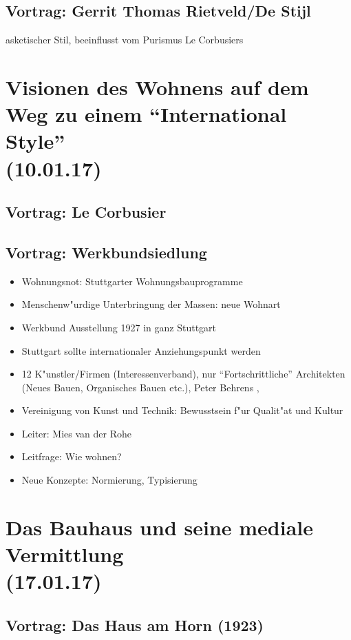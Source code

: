 \documentclass[emulatestandardclasses]{scrartcl}
\begin{document}
\subsection{Vortrag: Gerrit Thomas Rietveld/De Stijl}

asketischer Stil, beeinflusst vom Purismus Le Corbusiers

\section{Visionen des Wohnens auf dem Weg zu einem “International Style”\\(10.01.17)}

\subsection{Vortrag: Le Corbusier}

\subsection{Vortrag: Werkbundsiedlung}

\begin{itemize}
  \item Wohnungsnot: Stuttgarter Wohnungsbauprogramme
  \item Menschenw"urdige Unterbringung der Massen: neue Wohnart
  \item Werkbund Ausstellung 1927 in ganz Stuttgart
  \item Stuttgart sollte internationaler Anziehungspunkt werden
  \item 12 K"unstler/Firmen (Interessenverband), nur "`Fortschrittliche"' Architekten (Neues Bauen, Organisches Bauen etc.), Peter Behrens , 
  \item Vereinigung von Kunst und Technik: Bewusstsein f"ur Qualit"at und Kultur
  \item Leiter: Mies van der Rohe
  \item Leitfrage: Wie wohnen?
  \item Neue Konzepte: Normierung, Typisierung
\end{itemize}



\section{Das Bauhaus und seine mediale Vermittlung\\(17.01.17)}

\subsection{Vortrag: Das Haus am Horn (1923)}
\end{document}
